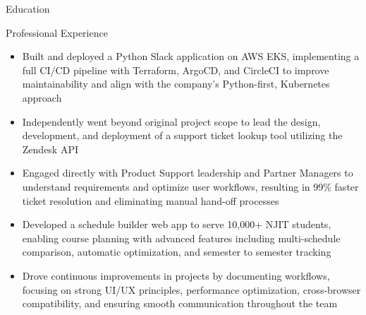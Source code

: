 \documentclass{resume}
\begin{document}
\introduction[
    fullname={Declan Blanchard},
    email={declanblanc@gmail.com},
    linkedin={linkedin.com/in/declanblanc},
    github={github.com/declanblanc}
]

\begin{educationSection}{Education}
    \educationItem[
        university={New Jersey Institute of Technology},
        graduation={May 2026},
        grade={3.8 GPA},
        program={Bachelor's, Computer Science}
    ]
\end{educationSection}

\begin{experienceSection}{Professional Experience}
    \experienceItem[
        company={Patreon},
        location={New York, NY},
        position={Software Engineer Intern},
        duration={May 2025 - Present}
    ]
    \begin{itemize}[itemsep=-6pt, leftmargin=1.2em, rightmargin=0.8em, before=\raggedright, after=\normalfont]
        \item Built and deployed a Python Slack application on AWS EKS, implementing a full CI/CD pipeline with Terraform, ArgoCD, and CircleCI to improve maintainability and align with the company's Python-first, Kubernetes approach
        \item Independently went beyond original project scope to lead the design, development, and deployment of a support ticket lookup tool utilizing the Zendesk API 
        \item Engaged directly with Product Support leadership and Partner Managers to understand requirements and optimize user workflows, resulting in 99\% faster ticket resolution and eliminating manual hand-off processes
    \end{itemize}


    \experienceItem[
        company={New Jersey Institute of Technology},
        location={Newark, NJ},
        position={Full Stack Developer},
        duration={January 2025 - Present}
    ]
    \begin{itemize}[itemsep=-6pt, leftmargin=1.2em, rightmargin=0.8em, before=\raggedright, after=\normalfont]
        \item Developed a schedule builder web app to serve 10,000+ NJIT students, enabling course planning with advanced features including multi-schedule comparison, automatic optimization, and semester to semester tracking
        \item Drove continuous improvements in projects by documenting workflows, focusing on strong UI/UX principles, performance optimization, cross-browser compatibility, and ensuring smooth communication throughout the team
    \end{itemize}


\end{experienceSection}
\end{document}

